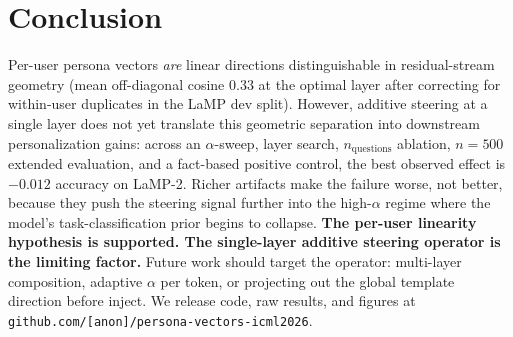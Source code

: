 \documentclass[10pt]{article}
\begin{document}
\section{Conclusion}
Per-user persona vectors \emph{are} linear directions distinguishable in
residual-stream geometry (mean off-diagonal cosine $0.33$ at the optimal
layer after correcting for within-user duplicates in the LaMP dev split).
However, additive steering at a single layer does not yet translate this
geometric separation into downstream personalization gains: across an
$\alpha$-sweep, layer search, $n_{\mathrm{questions}}$ ablation, $n{=}500$
extended evaluation, and a fact-based positive control, the best observed
effect is $-0.012$ accuracy on LaMP-2.  Richer artifacts make the failure
worse, not better, because they push the steering signal further into the
high-$\alpha$ regime where the model's task-classification prior begins to
collapse.
\textbf{The per-user linearity hypothesis is supported.  The single-layer
additive steering operator is the limiting factor.}
Future work should target the operator: multi-layer composition, adaptive
$\alpha$ per token, or projecting out the global template direction before
inject.
We release code, raw results, and figures at
\texttt{github.com/[anon]/persona-vectors-icml2026}.



\end{document}
